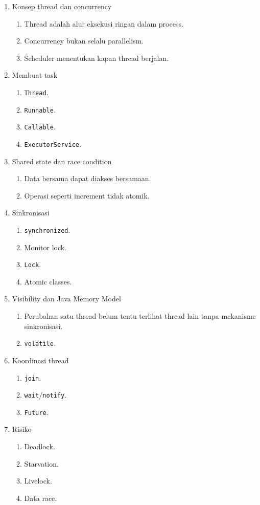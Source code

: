 \begin{enumerate}
    \item Konsep thread dan concurrency
    \begin{enumerate}
        \item Thread adalah alur eksekusi ringan dalam process.
        \item Concurrency bukan selalu parallelism.
        \item Scheduler menentukan kapan thread berjalan.
    \end{enumerate}
    \item Membuat task
    \begin{enumerate}
        \item \texttt{Thread}.
        \item \texttt{Runnable}.
        \item \texttt{Callable}.
        \item \texttt{ExecutorService}.
    \end{enumerate}
    \item Shared state dan race condition
    \begin{enumerate}
        \item Data bersama dapat diakses bersamaan.
        \item Operasi seperti increment tidak atomik.
    \end{enumerate}
    \item Sinkronisasi
    \begin{enumerate}
        \item \texttt{synchronized}.
        \item Monitor lock.
        \item \texttt{Lock}.
        \item Atomic classes.
    \end{enumerate}
    \item Visibility dan Java Memory Model
    \begin{enumerate}
        \item Perubahan satu thread belum tentu terlihat thread lain tanpa mekanisme sinkronisasi.
        \item \texttt{volatile}.
    \end{enumerate}
    \item Koordinasi thread
    \begin{enumerate}
        \item \texttt{join}.
        \item \texttt{wait}/\texttt{notify}.
        \item \texttt{Future}.
    \end{enumerate}
    \item Risiko
    \begin{enumerate}
        \item Deadlock.
        \item Starvation.
        \item Livelock.
        \item Data race.
    \end{enumerate}
\end{enumerate}

